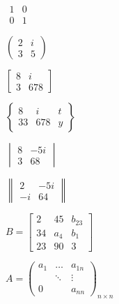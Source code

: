\documentclass{ctexart}
\begin{document}
    $
    \begin{matrix}%
        1 & 0 \\
        0 & 1
    \end{matrix} %
    $

    $
    \begin{pmatrix}%
        2 & i \\
        3 & 5
    \end{pmatrix}
    $

    $
    \begin{bmatrix}%
        8 & i \\
        3 & 678
    \end{bmatrix} %
    $

    $
    \begin{Bmatrix}%
        8 & i & t\\
        33 & 678 & y
    \end{Bmatrix}
    $

    $
    \begin{vmatrix}%
        8 & -5i \\
        3 & 68
    \end{vmatrix}
    $

    $
    \begin{Vmatrix}%
        2 & -5i \\
        -i & 64
    \end{Vmatrix}
    $

    $
    B = \begin{bmatrix}
        2 & 45 & b_{23} \\
        34 & a_{4} & b_{1} \\
        23 & 90 & 3
    \end{bmatrix}
    $

    $
    A = \begin{pmatrix}
        a_{1} & \dots & a_{1n} \\
        & \ddots & \vdots \\
        0 & & a_{nn}
    \end{pmatrix}_{n \times n} %
    $
\end{document}
